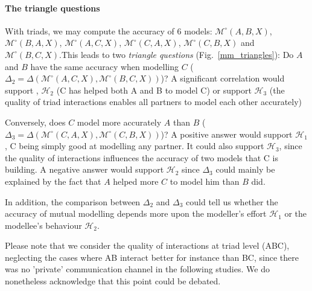 \documentclass[natbib]{svjour3}
\newcommand{\Model}[3]{{$\mathcal{M}^{\circ}(#1, #2, #3)$}}
\begin{document}
\paragraph{The triangle questions}

With triads, we may compute the accuracy of 6 models:
\Model{A}{B}{X}, \Model{B}{A}{X}, \Model{A}{C}{X}, \Model{C}{A}{X},
\Model{C}{B}{X} and \Model{B}{C}{X}.This leads to two \emph{triangle questions} (Fig.~\ref{mm_triangles}): Do $A$
and $B$ have the same accuracy when modelling $C$ ($\Delta_2 =
\Delta(\mathcal{M}^{\circ}(A,C,X), \mathcal{M}^{\circ}(B,C,X))$)? A significant correlation would support
, $\mathcal{H}_{2}$  (C has helped both A and B to model C) or support $\mathcal{H}_{3}$ (the quality of triad interactions enables all partners to model each other accurately)  


Conversely, does $C$ model more accurately $A$ than $B$ ($\Delta_3=
\Delta(\mathcal{M}^{\circ}(C,A,X), \mathcal{M}^{\circ}(C,B,X))$)? A positive
answer would support $\mathcal{H}_{1}$, C being simply good at modelling any partner.  It could also support  $\mathcal{H}_{3}$,  since the quality of interactions influences the accuracy of two models that C is building. A negative answer would support
$\mathcal{H}_{2}$ since $\Delta_3$ could mainly be explained by the fact that  $A$ helped more $C$ to model him than 
$B$ did. 

In addition, the comparison between $\Delta_2$ and $\Delta_3$ could tell us
whether the accuracy of mutual modelling depends more upon the modeller's effort  $\mathcal{H}_{1}$
or the modellee's behaviour  $\mathcal{H}_{2}$.

Please note that we consider the quality of interactions at triad level (ABC), neglecting the cases where AB interact better for instance than BC, since there was no 'private' communication channel in the following studies. We do nonetheless acknowledge that this point could be debated.
\end{document}
